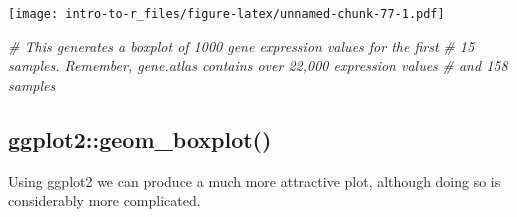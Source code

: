 \documentclass[a4paper]{book}
\newenvironment{Shaded}{\begin{snugshade}}{\end{snugshade}}
\newcommand{\CommentTok}[1]{\textcolor[rgb]{0.56,0.35,0.01}{\textit{{#1}}}}
\renewenvironment{Shaded}
{\vspace{1.5em}\begin{leftbar}\begin{snugshade}}
{\end{snugshade}\end{leftbar}\vspace{3pt}}
\begin{document}
\texttt{[image: intro-to-r\_files/figure-latex/unnamed-chunk-77-1.pdf]}

\begin{Shaded}
\begin{Highlighting}[]
\CommentTok{# This generates a boxplot of 1000 gene expression values for the first}
\CommentTok{# 15 samples. Remember, gene.atlas contains over 22,000 expression values}
\CommentTok{# and 158 samples}
\end{Highlighting}
\end{Shaded}

\subsection{ggplot2::geom\_boxplot()}\label{ggplot2geom_boxplot}

Using ggplot2 we can produce a much more attractive plot, although doing
so is considerably more complicated.
\end{document}
